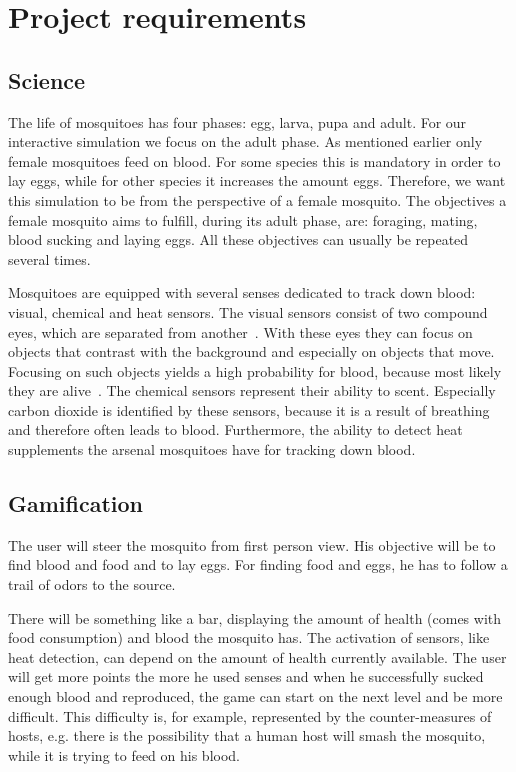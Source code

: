 \documentclass{acm_proc_article-sp}
\begin{document}
\section{Project requirements}

\subsection{Science}
The life of mosquitoes has four phases: egg, larva, pupa and adult. For our interactive simulation we focus on the adult phase. As mentioned earlier only female mosquitoes feed on blood. For some species this is mandatory in order to lay eggs, while for other species it increases the amount eggs. Therefore, we want this simulation to be from the perspective of a female mosquito. The objectives a female mosquito aims to fulfill, during its adult phase, are: foraging, mating, blood sucking and laying eggs. All these objectives can usually be repeated several times.

Mosquitoes are equipped with several senses dedicated to track down blood: visual, chemical and heat sensors. The visual sensors consist of two compound eyes, which are separated from another~\cite{wiki_mosq}. With these eyes they can focus on objects that contrast with the background and especially on objects that move. Focusing on such objects yields a high probability for blood, because most likely they are alive~\cite{howstuff}. The chemical sensors represent their ability to scent. Especially carbon dioxide is identified by these sensors, because it is a result of breathing and therefore often leads to blood. Furthermore, the ability to detect heat supplements the arsenal mosquitoes have for tracking down blood.

\subsection{Gamification}
The user will steer the mosquito from first person view. His objective will be to find blood and food and to lay eggs. For finding food and eggs, he has to follow a trail of odors to the source.

There will be something like a bar, displaying the amount of health (comes with food consumption) and blood the mosquito has. The activation of sensors, like heat detection, can depend on the amount of health currently available. The user will get more points the more he used senses and when he successfully sucked enough blood and reproduced, the game can start on the next level and be more difficult. This difficulty is, for example, represented by the counter-measures of hosts, e.g. there is the possibility that a human host will smash the mosquito, while it is trying to feed on his blood.
\end{document}
